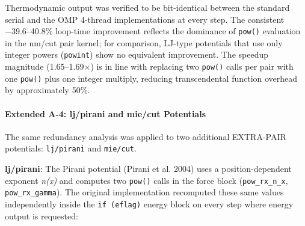 \documentclass[
  11pt,
]{article}
\begin{document}
Thermodynamic output was verified to be bit-identical between the
standard serial and the OMP 4-thread implementations at every step. The
consistent −39.6--40.8\% loop-time improvement reflects the dominance of
\texttt{pow()} evaluation in the nm/cut pair kernel; for comparison,
LJ-type potentials that use only integer powers (\texttt{powint}) show
no equivalent improvement. The speedup magnitude (1.65--1.69\(\times\))
is in line with replacing two \texttt{pow()} calls per pair with one
\texttt{pow()} plus one integer multiply, reducing transcendental
function overhead by approximately 50\%.

\paragraph{Extended A-4: lj/pirani and mie/cut
Potentials}\label{extended-a-4-ljpirani-and-miecut-potentials}

The same redundancy analysis was applied to two additional EXTRA-PAIR
potentials: \texttt{lj/pirani} and \texttt{mie/cut}.

\textbf{lj/pirani}: The Pirani potential (Pirani et al. 2004) uses a
position-dependent exponent \emph{n(x)} and computes two \texttt{pow()}
calls in the force block (\texttt{pow\_rx\_n\_x},
\texttt{pow\_rx\_gamma}). The original implementation recomputed these
same values independently inside the \texttt{if\ (eflag)} energy block
on every step where energy output is requested:
\end{document}
